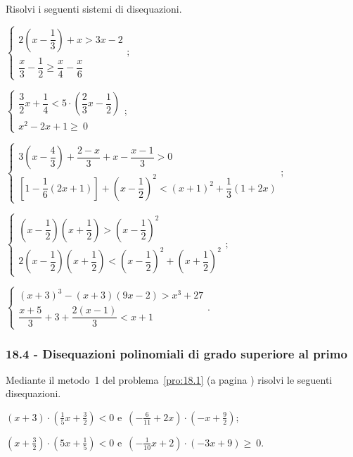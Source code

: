 \begin{esercizio}[\Ast]
 \label{ese:18.44}
 Risolvi i seguenti sistemi di disequazioni.

 \begin{enumeratea}
 \item {\longarray $\left\{\begin{array}{l}
	2\left(x-\dfrac{1}{3}\right)+x>3x-2\\
	\dfrac{x}{3}-\dfrac{1}{2}\ge \dfrac{x}{4}-\dfrac{x}{6}
   \end{array}\right.;$}
\item $\left\{\begin{array}{l}
    \dfrac{3}{2}x+\dfrac{1}{4}<5\cdot\left(\dfrac{2}{3}x-\dfrac{1}{2}\right)\\
    x^2-2x+1\ge~0
   \end{array}\right.;$
\item {\longarray $\left\{\begin{array}{l}
	3\left(x-\dfrac{4}{3}\right)+\dfrac{2-x}{3}+x-\dfrac{x-1}{3}>0\\
	\left[1-\dfrac{1}{6}(2x+1)\right]+\left(x-\dfrac{1}{2}\right)^{2}<(x+1)^{2}+\dfrac{1}{3}(1+2x)
   \end{array}\right.;$}
\item {\longarray $\left\{\begin{array}{l}
	\left(x-\dfrac{1}{2}\right)\left(x+\dfrac{1}{2}\right)>\left(x-\dfrac{1}{2}\right)^{2}\\
	2\left(x-\dfrac{1}{2}\right)\left(x+\dfrac{1}{2}\right)<\left(x-\dfrac{1}{2}\right)^{2}+\left(x+\dfrac{1}{2}\right)^{2}
   \end{array}\right.;$}
\item {\longarray $\left\{\begin{array}{l}
  (x+3)^{3}-(x+3)(9x-2)>x^{3}+27\\
  \dfrac{x+5}{3}+3+\dfrac{2(x-1)}{3}<x+1
 \end{array}\right..$}
 \end{enumeratea}
\end{esercizio}

\subsubsection*{18.4 - Disequazioni polinomiali di grado superiore al primo}
\begin{esercizio}
 \label{ese:18.45}
 Mediante il metodo~1 del problema~\ref{pro:18.1} (a pagina \pageref{pro:18.1}) risolvi le seguenti disequazioni.

\begin{enumeratea}
\item $(x+3)\cdot \left(\frac{1}{5}x+\frac{3}{2}\right)<0$ e~$\left(-{\frac{6}{11}}+2x\right)\cdot\left(-x+\frac{9}{2}\right)$;
\item $\left(x+\frac{3}{2}\right)\cdot \left(5x+\frac{1}{5}\right)<0$ e~$\left(-{\frac{1}{10}}x+2\right)\cdot \left(-3x+9\right)\ge~0$.
\end{enumeratea}

\end{esercizio}

